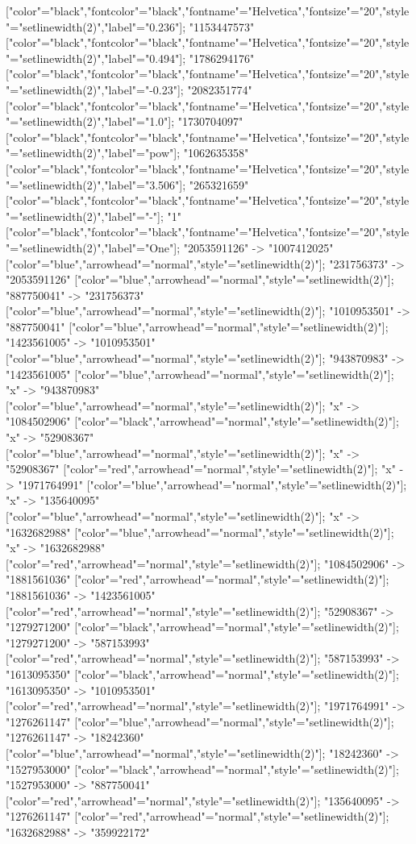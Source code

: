 ["color"="black","fontcolor"="black","fontname"="Helvetica","fontsize"="20","style"="setlinewidth(2)","label"="0.236"]; "1153447573" ["color"="black","fontcolor"="black","fontname"="Helvetica","fontsize"="20","style"="setlinewidth(2)","label"="0.494"]; "1786294176" ["color"="black","fontcolor"="black","fontname"="Helvetica","fontsize"="20","style"="setlinewidth(2)","label"="-0.23"]; "2082351774" ["color"="black","fontcolor"="black","fontname"="Helvetica","fontsize"="20","style"="setlinewidth(2)","label"="1.0"]; "1730704097" ["color"="black","fontcolor"="black","fontname"="Helvetica","fontsize"="20","style"="setlinewidth(2)","label"="pow"]; "1062635358" ["color"="black","fontcolor"="black","fontname"="Helvetica","fontsize"="20","style"="setlinewidth(2)","label"="3.506"]; "265321659" ["color"="black","fontcolor"="black","fontname"="Helvetica","fontsize"="20","style"="setlinewidth(2)","label"="-"]; "1" ["color"="black","fontcolor"="black","fontname"="Helvetica","fontsize"="20","style"="setlinewidth(2)","label"="One"]; "2053591126" -> "1007412025" ["color"="blue","arrowhead"="normal","style"="setlinewidth(2)"]; "231756373" -> "2053591126" ["color"="blue","arrowhead"="normal","style"="setlinewidth(2)"]; "887750041" -> "231756373" ["color"="blue","arrowhead"="normal","style"="setlinewidth(2)"]; "1010953501" -> "887750041" ["color"="blue","arrowhead"="normal","style"="setlinewidth(2)"]; "1423561005" -> "1010953501" ["color"="blue","arrowhead"="normal","style"="setlinewidth(2)"]; "943870983" -> "1423561005" ["color"="blue","arrowhead"="normal","style"="setlinewidth(2)"]; "x" -> "943870983" ["color"="blue","arrowhead"="normal","style"="setlinewidth(2)"]; "x" -> "1084502906" ["color"="black","arrowhead"="normal","style"="setlinewidth(2)"]; "x" -> "52908367" ["color"="blue","arrowhead"="normal","style"="setlinewidth(2)"]; "x" -> "52908367" ["color"="red","arrowhead"="normal","style"="setlinewidth(2)"]; "x" -> "1971764991" ["color"="blue","arrowhead"="normal","style"="setlinewidth(2)"]; "x" -> "135640095" ["color"="blue","arrowhead"="normal","style"="setlinewidth(2)"]; "x" -> "1632682988" ["color"="blue","arrowhead"="normal","style"="setlinewidth(2)"]; "x" -> "1632682988" ["color"="red","arrowhead"="normal","style"="setlinewidth(2)"]; "1084502906" -> "1881561036" ["color"="red","arrowhead"="normal","style"="setlinewidth(2)"]; "1881561036" -> "1423561005" ["color"="red","arrowhead"="normal","style"="setlinewidth(2)"]; "52908367" -> "1279271200" ["color"="black","arrowhead"="normal","style"="setlinewidth(2)"]; "1279271200" -> "587153993" ["color"="red","arrowhead"="normal","style"="setlinewidth(2)"]; "587153993" -> "1613095350" ["color"="black","arrowhead"="normal","style"="setlinewidth(2)"]; "1613095350" -> "1010953501" ["color"="red","arrowhead"="normal","style"="setlinewidth(2)"]; "1971764991" -> "1276261147" ["color"="blue","arrowhead"="normal","style"="setlinewidth(2)"]; "1276261147" -> "18242360" ["color"="blue","arrowhead"="normal","style"="setlinewidth(2)"]; "18242360" -> "1527953000" ["color"="black","arrowhead"="normal","style"="setlinewidth(2)"]; "1527953000" -> "887750041" ["color"="red","arrowhead"="normal","style"="setlinewidth(2)"]; "135640095" -> "1276261147" ["color"="red","arrowhead"="normal","style"="setlinewidth(2)"]; "1632682988" -> "359922172" 